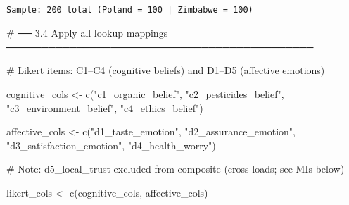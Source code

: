 \documentclass[
  letterpaper,
  DIV=11,
  numbers=noendperiod]{scrartcl}
\newenvironment{Shaded}{\begin{snugshade}}{\end{snugshade}}
\newcommand{\CommentTok}[1]{\textcolor[rgb]{0.37,0.37,0.37}{#1}}
\newcommand{\FunctionTok}[1]{\textcolor[rgb]{0.28,0.35,0.67}{#1}}
\newcommand{\NormalTok}[1]{\textcolor[rgb]{0.00,0.23,0.31}{#1}}
\newcommand{\OtherTok}[1]{\textcolor[rgb]{0.00,0.23,0.31}{#1}}
\newcommand{\StringTok}[1]{\textcolor[rgb]{0.13,0.47,0.30}{#1}}
\begin{document}
\begin{verbatim}

Sample: 200 total (Poland = 100 | Zimbabwe = 100)
\end{verbatim}

\begin{Shaded}
\begin{Highlighting}[]
\CommentTok{\# ── 3.4  Apply all lookup mappings ────────────────────────────────────────────}

\CommentTok{\# Likert items: C1–C4 (cognitive beliefs) and D1–D5 (affective emotions)}

\NormalTok{cognitive\_cols }\OtherTok{\textless{}{-}} \FunctionTok{c}\NormalTok{(}\StringTok{"c1\_organic\_belief"}\NormalTok{, }\StringTok{"c2\_pesticides\_belief"}\NormalTok{,}
                    \StringTok{"c3\_environment\_belief"}\NormalTok{, }\StringTok{"c4\_ethics\_belief"}\NormalTok{)}

\NormalTok{affective\_cols }\OtherTok{\textless{}{-}} \FunctionTok{c}\NormalTok{(}\StringTok{"d1\_taste\_emotion"}\NormalTok{, }\StringTok{"d2\_assurance\_emotion"}\NormalTok{,}
                    \StringTok{"d3\_satisfaction\_emotion"}\NormalTok{, }\StringTok{"d4\_health\_worry"}\NormalTok{)}

\CommentTok{\# Note: d5\_local\_trust excluded from composite (cross{-}loads; see MIs below)}

\NormalTok{likert\_cols }\OtherTok{\textless{}{-}} \FunctionTok{c}\NormalTok{(cognitive\_cols, affective\_cols)}


\end{Highlighting}
\end{Shaded}
\end{document}
